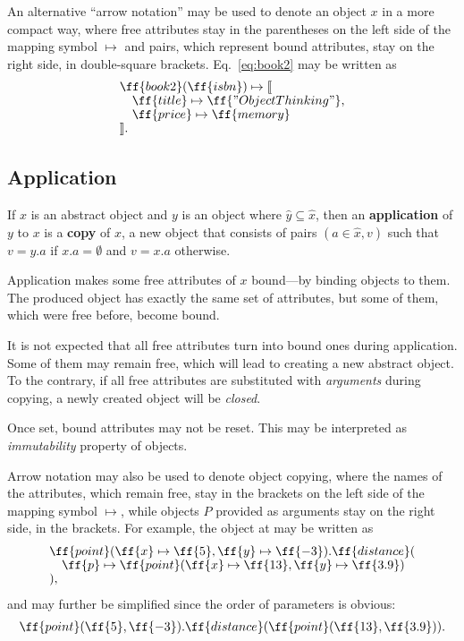 An alternative ``arrow notation'' may be used to denote an object $x$ in a more
compact way, where free attributes stay in the parentheses on the left side of the
mapping symbol $\mapsto$ and pairs,
which represent bound attributes, stay on the right side, in double-square brackets.
Eq.~\ref{eq:book2} may be written as
\begin{equation}\label{eq:book2-compact}
\begin{split}
& \ff{book2}(\ff{isbn}) \mapsto \llbracket \br
& \quad \ff{title} \mapsto \ff{"Object Thinking"}, \br
& \quad \ff{price} \mapsto \ff{memory} \br
& \rrbracket. \\
\end{split}
\end{equation}

\subsection{Application}

\begin{eodefinition}\label{def:application}
If $x$ is an abstract object and $y$ is an object
  where $\hat{y}\subseteq\hat{x}$,
  then an \textbf{application} of $y$ to $x$ is
  a \textbf{copy} of $x$, a new object that consists of pairs $(a\in\hat{x},v)$ such that
  $v=y.a$ if $x.a=\emptyset$ and $v=x.a$ otherwise.
\end{eodefinition}

Application makes some free attributes of $x$ bound---by binding objects to them.
The produced object has exactly the same set of attributes, but some of them,
which were free before, become bound.

It is not expected that all free attributes turn into bound ones during application.
Some of them may remain free, which will lead
to creating a new abstract object. To the contrary,
if all free attributes are substituted with \emph{arguments} during copying,
a newly created object will be \emph{closed}.

Once set, bound attributes may not be reset.
This may be interpreted as \emph{immutability} property of objects.

Arrow notation may also be used to denote object copying,
where the names of the attributes, which remain free, stay in the brackets
on the left side of the mapping symbol $\mapsto$,
while objects $P$ provided as arguments stay on the right side,
in the brackets. For example, the object at  may be written as
\begin{equation}\label{eq:point}
\begin{split}
& \ff{point}(\ff{x} \mapsto \ff{5}, \ff{y} \mapsto \ff{-3}).\ff{distance}(\br
& \quad \ff{p} \mapsto \ff{point}(\ff{x} \mapsto \ff{13}, \ff{y} \mapsto \ff{3.9}) \br
& ),
\end{split}
\end{equation}
and may further be simplified since the order of parameters is obvious:
\begin{equation}
\begin{split}
\ff{point}(\ff{5}, \ff{-3}).\ff{distance}(\ff{point}(\ff{13}, \ff{3.9})).
\end{split}
\end{equation}

